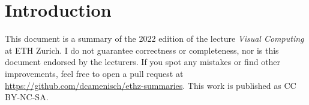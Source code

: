 \section{Introduction}

This document is a summary of the 2022 edition of the lecture \textit{Visual Computing} at ETH Zurich. I do not guarantee correctness or completeness, nor is this document endorsed by the lecturers. If you spot any mistakes or find other improvements, feel free to open a pull request at \url{https://github.com/dcamenisch/ethz-summaries}. This work is published as CC BY-NC-SA.
\begin{center}
	\ccbyncsa
\end{center}
